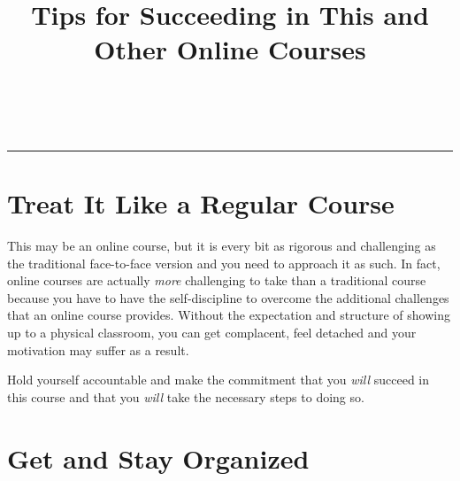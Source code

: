 \documentclass[12pt]{scrartcl}
\title{Tips for Succeeding in This and Other Online Courses}\let\Title\@title
\subtitle{Computer Science I\\
{\small
\vskip.5cm
Department of Computer Science \& Engineering \\
University of Nebraska--Lincoln}
\vskip-2cm}
\date{~}
\begin{document}
\maketitle

\hrule

\section{Treat It Like a Regular Course}

This may be an online course, but it is every bit as rigorous and challenging
as the traditional face-to-face version and you need to approach it as such.
In fact, online courses are actually \emph{more} challenging to take than 
a traditional course because you have to have the self-discipline to overcome
the additional challenges that an online course provides.  Without the expectation
and structure of showing up to a physical classroom, you can get complacent, 
feel detached and your motivation may suffer as a result.

Hold yourself accountable and make the commitment that you \emph{will} succeed
in this course and that you \emph{will} take the necessary steps to doing so.

\section{Get and Stay Organized}
\end{document}
